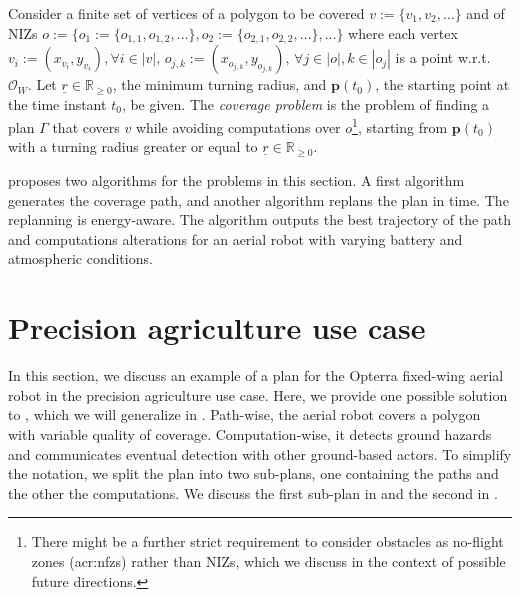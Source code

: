 \begin{pb}
  \label{pb:cov-pb}
  Consider a finite set of vertices of a polygon to be covered $v:=\{v_1,v_2,\dots\}$ and of NIZs $o:=\{o_1:=\{o_{1,1},o_{1,2},\dots\},o_2:=\{o_{2,1},o_{2,2},\dots\},\dots\}$ where each vertex $v_i:=(x_{v_i},y_{v_i}),\forall i\in|v|,\,o_{j,k}:=(x_{o_{j,k}},y_{o_{j,k}}),\,\forall j\in|o|,k\in|o_j|$ is a point w.r.t. $\mathcal{O}_W$. Let $\underline{r}\in\mathbb{R}_{\geq 0}$, the minimum turning radius, and $\mathbf{p}(t_0)$, the starting point at the time instant $t_0$, be given. The \emph{coverage problem} is the problem of finding a plan $\Gamma$ that covers $v$ while avoiding computations over $o$\footnote{There might be a further strict requirement to consider obstacles as no-flight zones (\Gls{acr:nfz}s) rather than NIZs, which we discuss in the context of possible future directions.}, starting from $\mathbf{p}(t_0)$ with a turning radius greater or equal to $\underline{r}\in\mathbb{R}_{\geq 0}$.
\end{pb}    

 proposes two algorithms for the problems in this section. A first algorithm generates the coverage path, and another algorithm replans the plan in time. The replanning is energy-aware. The algorithm outputs the best trajectory of the path and computations alterations for an aerial robot with varying battery and atmospheric conditions. 


\section{Precision agriculture use case}
\label{sec:flight-plan}

In this section, we discuss an example of a plan for the Opterra fixed-wing aerial robot in the precision agriculture use case. Here, we provide one possible solution to , which we will generalize in . Path-wise, the aerial robot covers a polygon with variable quality of coverage. Computation-wise, it detects ground hazards and communicates eventual detection with other ground-based actors. To simplify the notation, we split the plan into two sub-plans, one containing the paths and the other the computations. We discuss the first sub-plan in  and the second in .

